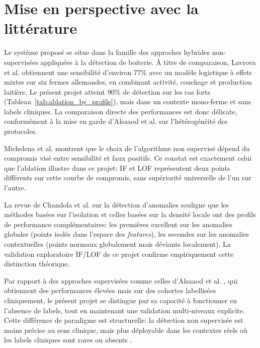\FloatBarrier
\section{Mise en perspective avec la littérature}

Le système proposé se situe dans la famille des approches hybrides non-supervisées
appliquées à la détection de boiterie. À titre de comparaison, Lavrova et al.
\citep{lavrova2023lameness} obtiennent une sensibilité d'environ 77\% avec un modèle
logistique à effets mixtes sur six fermes allemandes, en combinant activité, couchage et
production laitière. Le présent projet atteint 90\% de détection sur les cas forts
(Tableau~\ref{tab:ablation_by_profile}), mais dans un contexte mono-ferme et sans labels
cliniques. La comparaison directe des performances est donc délicate, conformément à la
mise en garde d'Alsaaod et al. \citep{alsaaod2019automatic} sur l'hétérogénéité des
protocoles.

Michelena et al. \citep{michelena2025comparative} montrent que le choix de l'algorithme non
supervisé dépend du compromis visé entre sensibilité et faux positifs. Ce constat est
exactement celui que l'ablation illustre dans ce projet: IF et LOF représentent deux points
différents sur cette courbe de compromis, sans supériorité universelle de l'un sur l'autre.

La revue de Chandola et al. \citep{chandola2009anomaly} sur la détection d'anomalies
souligne que les méthodes basées sur l'isolation et celles basées sur la densité locale
ont des profils de performance complémentaires: les premières excellent sur les anomalies
globales (points isolés dans l'espace des \textit{features}), les secondes sur les anomalies
contextuelles (points normaux globalement mais déviants localement). La validation
exploratoire IF/LOF de ce projet confirme empiriquement cette distinction théorique.

Par rapport à des approches supervisées comme celles d'Alsaaod et al.
\citep{alsaaod2012electronic}, qui obtiennent des performances élevées mais sur des
cohortes labellisées cliniquement, le présent projet se distingue par sa capacité à
fonctionner en l'absence de labels, tout en maintenant une validation multi-niveaux
explicite. Cette différence de paradigme est structurelle: la détection non supervisée est
moins précise au sens clinique, mais plus déployable dans les contextes réels où les labels
cliniques sont rares ou absents \citep{qiao2021review}.

